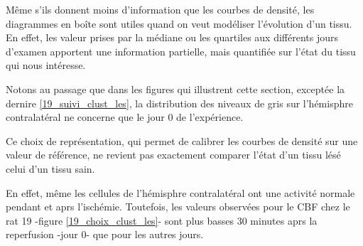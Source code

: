 \par
M\^eme s'ils donnent moins d'information que les courbes de densit\'e, les diagrammes en bo\^ite sont utiles quand on veut mod\'eliser l'\'evolution d'un tissu. %
En effet, les valeur prises par la m\'ediane ou les quartiles aux diff\'erents jours d'examen apportent une information partielle, %
mais quantifi\'ee sur l'\'etat du tissu qui nous int\'eresse.

\par
Notons au passage que dans les figures qui illustrent cette section, except\'ee la dernire \ref{19_suivi_clust_les}, %
la distribution des niveaux de gris sur l'h\'emisphre contralat\'eral ne concerne que le jour 0 de l'exp\'erience.

\par
Ce choix de repr\'esentation, qui permet de calibrer les courbes de densit\'e sur une valeur de r\'ef\'erence, %
ne revient pas exactement  comparer l'\'etat d'un tissu l\'es\'e  celui d'un tissu sain.

\par
En effet, m\^eme les cellules de l'h\'emisphre contralat\'eral ont une activit\'e normale pendant et aprs l'isch\'emie. %
Toutefois, les valeurs observ\'ees pour le CBF chez le rat 19 -figure \ref{19_choix_clust_les}- sont plus basses 30 minutes aprs la reperfusion -jour 0- %
que pour les autres jours.


